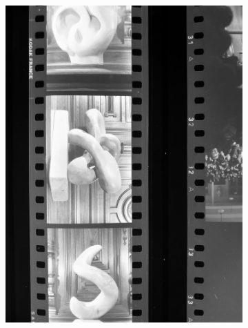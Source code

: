 \begin{figure}[H]
\begin{subfigure}{0.24\textwidth}
        \caption{}
    \end{subfigure}
    \begin{subfigure}{0.24\textwidth}
        \includegraphics[width=\linewidth]{Illustrations/P3.jpg}
        \caption{}
    \end{subfigure}
    \begin{subfigure}{0.24\textwidth}

\end{subfigure}
\end{figure}

